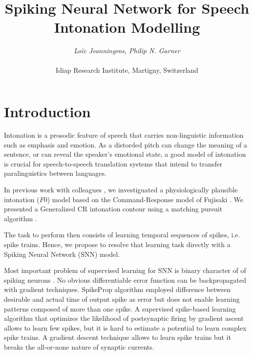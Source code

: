 \documentclass[letterpaper, 10 pt, conference]{ieeeconf}  %
\title{\LARGE \bf
Spiking Neural Network for Speech Intonation Modelling
}
\author{\textit{Lo\"ic Jeanningros, Philip N. Garner} \\
\\
Idiap Research Institute, Martigny, Switzerland%
}
\begin{document}
\maketitle
\thispagestyle{empty}
\pagestyle{empty}


\begin{abstract}



\end{abstract}


\section{Introduction}
Intonation is a prosodic feature of speech that carries non-linguistic information such as emphasis and emotion. As a distorded pitch can change the meaning of a sentence, or can reveal the speaker's emotional state, a good model of intonation is crucial for speech-to-speech translation systems that intend to transfer paralinguistics between languages.

In previous work with colleagues \cite{honnet2015atom}, we investiguated a physiologically plausible intonation ($F0$) model based on the Command-Response model of Fujisaki \cite{fujisaki1998command}. We presented a Generalized CR intonation contour using a matching pursuit algorithm \cite{mallat1993matching}. 

The task to perform then consists of learning temporal sequences of spikes, i.e. spike trains. Hence, we propose to resolve that learning task directly with a Spiking Neural Network (SNN) model.


Most important problem of supervised learning for SNN is binary character of of spiking neurons \cite{gavrilov2016methods}. No obvious differentiable error function can be backpropagated with gradient techniques. 
SpikeProp algorithm \cite{bohte2002error} employed difference between desirable and actual time of output spike as error but does not enable learning patterns composed of more than one spike. 
A supervised spike-based learning algorithm \cite{pfister2006optimal} that optimizes the likelihood of postsynaptic firing by gradient ascent allows to learn few spikes, but it is hard to estimate a potential to learn complex spike trains.
A gradient descent technique \cite{huh2018gradient} allows to learn spike trains but it breaks the all-or-none nature of synaptic currents.
\end{document}
